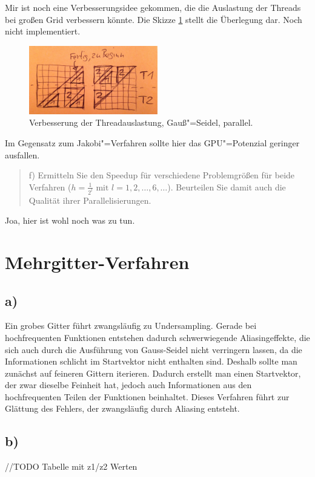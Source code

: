 \documentclass[paper = a4]{scrartcl}
\begin{document}
Mir ist noch eine Verbesserungsidee gekommen, die die Auslastung der Threads bei großen Grid verbessern könnte. Die Skizze \ref{fig:gaussseideldreiecke} stellt die Überlegung dar. Noch nicht implementiert.

\begin{figure}
    \centering
    \includegraphics[width=0.5\textwidth]{gaussseideldreiecke}
    \caption{Verbesserung der Threadauslastung, Gauß"=Seidel, parallel.}
    \label{fig:gaussseideldreiecke}
\end{figure}

Im Gegensatz zum Jakobi"=Verfahren sollte hier das GPU"=Potenzial geringer ausfallen.

\begin{quote}
    f) Ermitteln Sie den Speedup für verschiedene Problemgrößen für beide Verfahren (\(h = \frac{1}{2^l} \text{ mit } l = 1, 2, \dots, 6, \dots\)). Beurteilen Sie damit auch die Qualität ihrer Parallelisierungen.
\end{quote}

Joa, hier ist wohl noch was zu tun.


\section{Mehrgitter-Verfahren}

\subsection*{a)}
Ein grobes Gitter führt zwangsläufig zu Undersampling. Gerade bei hochfrequenten Funktionen entstehen dadurch schwerwiegende Aliasingeffekte, die sich auch durch die Ausführung von Gauss-Seidel nicht verringern lassen, da die Informationen schlicht im Startvektor nicht enthalten sind. Deshalb sollte man zunächst auf feineren Gittern iterieren. Dadurch erstellt man einen Startvektor, der zwar dieselbe Feinheit hat, jedoch auch Informationen aus den hochfrequenten Teilen der Funktionen beinhaltet. Dieses Verfahren führt zur Glättung des Fehlers, der zwangsläufig durch Aliasing entsteht.

\subsection*{b)}
//TODO Tabelle mit z1/z2 Werten
\end{document}
